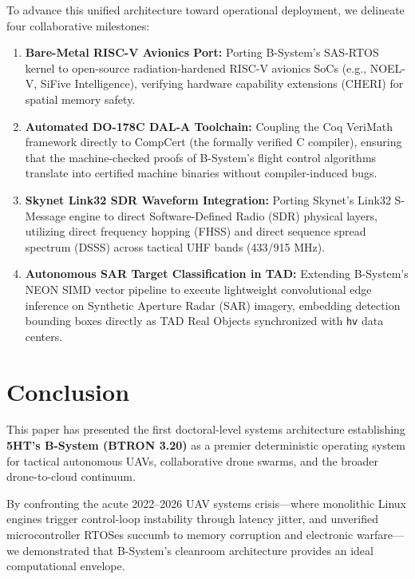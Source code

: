 \documentclass[10pt,journal,compsoc,twocolumn]{article}
\begin{document}
To advance this unified architecture toward operational deployment, we delineate four collaborative milestones:
\begin{enumerate}[leftmargin=*]
    \item \textbf{Bare-Metal RISC-V Avionics Port:} Porting B-System's SAS-RTOS kernel to open-source radiation-hardened RISC-V avionics SoCs (e.g., NOEL-V, SiFive Intelligence), verifying hardware capability extensions (CHERI) for spatial memory safety.
    \item \textbf{Automated DO-178C DAL-A Toolchain:} Coupling the Coq VeriMath framework directly to CompCert (the formally verified C compiler), ensuring that the machine-checked proofs of B-System's flight control algorithms translate into certified machine binaries without compiler-induced bugs.
    \item \textbf{Skynet Link32 SDR Waveform Integration:} Porting Skynet's Link32 S-Message engine to direct Software-Defined Radio (SDR) physical layers, utilizing direct frequency hopping (FHSS) and direct sequence spread spectrum (DSSS) across tactical UHF bands (433/915 MHz).
    \item \textbf{Autonomous SAR Target Classification in TAD:} Extending B-System's NEON SIMD vector pipeline to execute lightweight convolutional edge inference on Synthetic Aperture Radar (SAR) imagery, embedding detection bounding boxes directly as TAD Real Objects synchronized with \texttt{hv} data centers.
\end{enumerate}

\section{Conclusion}
\label{sec:conclusion}

This paper has presented the first doctoral-level systems architecture establishing \textbf{5HT's B-System (BTRON 3.20)} as a premier deterministic operating system for tactical autonomous UAVs, collaborative drone swarms, and the broader drone-to-cloud continuum.

By confronting the acute 2022--2026 UAV systems crisis—where monolithic Linux engines trigger control-loop instability through latency jitter, and unverified microcontroller RTOSes succumb to memory corruption and electronic warfare—we demonstrated that B-System's cleanroom architecture provides an ideal computational envelope. 
\end{document}
